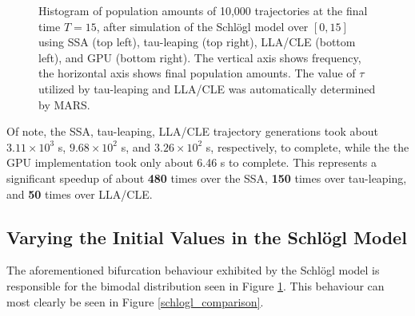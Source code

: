\documentclass[ugrad,lot,lof,openright,11pt,oneside,onehalfspace]{RUthesis}
\begin{document}
\begin{figure}[H]
{			}
		\captionsetup{width=0.8\textwidth}
		\caption[Histogram of end populations of the Schl\"{o}gl model from 10,000 trajectories]{Histogram of population amounts of 10,000 trajectories at the final time $T=15$, after simulation of the Schl\"{o}gl model over $[0,15]$ using SSA (top left), tau-leaping (top right), LLA/CLE (bottom left), and GPU (bottom right). The vertical axis shows frequency, the horizontal axis shows final population amounts. The value of $\tau$ utilized by tau-leaping and LLA/CLE was automatically determined by MARS.}
		\label{schlogl_hist_figure}
		\end{figure}

		\noindent
		Of note, the SSA, tau-leaping, LLA/CLE trajectory generations took about $3.11 \times 10^3$ s, $9.68 \times 10^2$ s, and $3.26 \times 10^2$ s, respectively, to complete, while the the GPU implementation took only about 6.46 s to complete. This represents a significant speedup of about {\bf 480} times over the SSA, {\bf 150} times over tau-leaping, and {\bf 50} times over LLA/CLE.

		\subsection{Varying the Initial Values in the Schl\"{o}gl Model}

			The aforementioned bifurcation behaviour exhibited by the Schl\"{o}gl model is responsible for the bimodal distribution seen in Figure \ref{schlogl_hist_figure}. This behaviour can most clearly be seen in Figure \ref{schlogl_comparison}.
\end{document}
